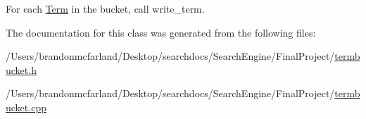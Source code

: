 For each \hyperlink{class_term}{Term} in the bucket, call write\+\_\+term. 



The documentation for this class was generated from the following files\+:\begin{DoxyCompactItemize}
\item 
/\+Users/brandonmcfarland/\+Desktop/searchdocs/\+Search\+Engine/\+Final\+Project/\hyperlink{termbucket_8h}{termbucket.\+h}\item 
/\+Users/brandonmcfarland/\+Desktop/searchdocs/\+Search\+Engine/\+Final\+Project/\hyperlink{termbucket_8cpp}{termbucket.\+cpp}\end{DoxyCompactItemize}
